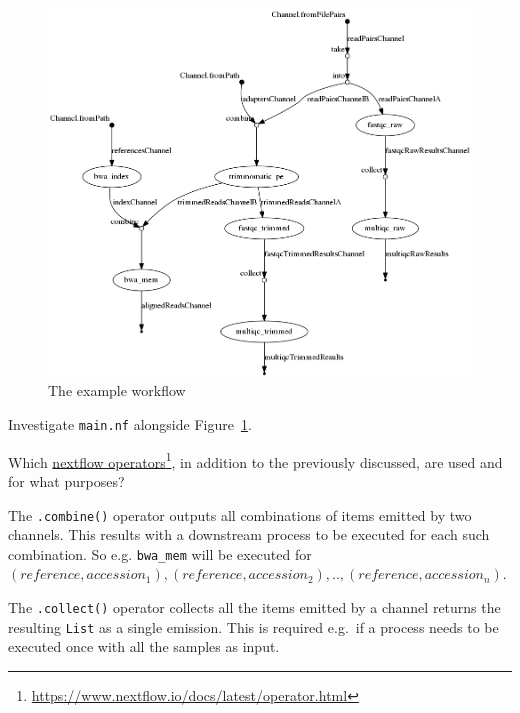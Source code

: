 \begin{figure}[H]
\centering
\includegraphics[width=\textwidth]{handout/flowchart.png}
\caption{The example workflow}
\label{fig:dag}
\end{figure}


\begin{questions}
Investigate \texttt{main.nf} alongside Figure~\ref{fig:dag}. 

Which \href{https://www.nextflow.io/docs/latest/operator.html}{nextflow operators}\footnote{\url{https://www.nextflow.io/docs/latest/operator.html}}, in addition to the previously discussed, are used and for what purposes? 

\begin{answer}
The \texttt{.combine()} operator outputs all combinations of items emitted by two channels. This results with a downstream process to be executed for each such combination. So e.g. \texttt{bwa\_mem} will be executed for\\ $(reference, accession_1),(reference, accession_2),..,(reference, accession_n)$.

The \texttt{.collect()} operator collects all the items emitted by a channel returns the resulting \texttt{List} as a single emission. This is required e.g.\ if a process needs to be executed once with all the samples as input.
\end{answer}

\end{questions}


